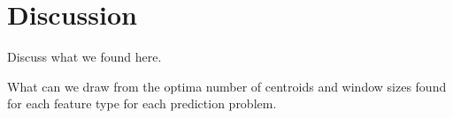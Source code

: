 \section{Discussion}

Discuss what we found here.

What can we draw from the optima number of centroids and window sizes found for each feature type for each prediction problem.
